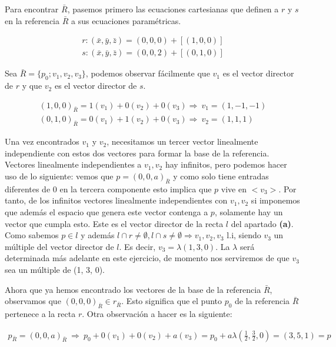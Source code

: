  Para encontrar $\bar{R}$, pasemos primero las ecuaciones cartesianas que definen a  $r$ y $s$ en la referencia $\bar{R}$ a sus ecuaciones paramétricas.
 
 \begin{gather*}
     r : (\bar{x},\bar{y}, \bar{z}) = (0, 0, 0) + [(1, 0, 0)] \\
     s : (\bar{x}, \bar{y}, \bar{z}) = (0, 0, 2) + [(0, 1, 0)]
 \end{gather*}
 
 Sea $\bar{R} = \{p_0; v_1, v_2, v_3\}$, podemos observar fácilmente que $v_1$ es el vector director de $r$ y que $v_2$ es el vector director de $s$.
 
 \begin{gather*}
     (1, 0, 0)_{\bar{R}} = 1(v_1) + 0(v_2) + 0(v_3) \Longrightarrow \ v_1 = (1, -1, -1) \\
     (0, 1, 0)_{\bar{R}} = 0(v_1) + 1(v_2) + 0(v_3) \Longrightarrow \ v_2 = (1, 1, 1)
 \end{gather*}
 
Una vez encontrados $v_1$ y $v_2$, necesitamos un tercer vector linealmente independiente con estos dos vectores para formar la base de la referencia. Vectores linealmente independientes a $v_1, v_2$ hay infinitos, pero podemos hacer uso de lo siguiente: vemos que $p=(0, 0, a)_{\bar{R}}$ y como solo tiene entradas diferentes de 0 en la tercera componente esto implica que $p$ vive en $<v_3>$. Por tanto, de los infinitos vectores linealmente independientes con $v_1, v_2$ si imponemos que además el espacio que genera este vector contenga a $p$, solamente hay un vector que cumpla esto. Este es el vector director de la recta $l$ del apartado \textbf{(a)}. Como sabemos $p \in l$ y además $l \cap r \neq \emptyset, l \cap s \neq \emptyset \Longrightarrow v_1, v_2, v_3$ l.i, siendo $v_3$ un múltiple del vector director de $l$. Es decir, $v_3 = \lambda(1,3,0)$. La $\lambda$ será determinada más adelante en este ejercicio, de momento nos serviremos de que $v_3$ sea un múltiple de (1, 3, 0).

Ahora que ya hemos encontrado los vectores de la base de la referencia $\bar{R}$, observamos que $(0, 0, 0)_{\bar{R}} \in r_{\bar{R}}$. Esto significa que el punto $p_0$ de la referencia $\bar{R}$ pertenece a la recta $r$. Otra observación a hacer es la siguiente:
 
 \begin{gather*}
     p_{\bar{R}} = (0, 0, a)_{\bar{R}} \ \Longrightarrow \ p_0 + 0(v_1) + 0(v_2) + a(v_3) = p_0 + a\lambda(\frac{1}{2}, \frac{3}{2}, 0) = (3, 5, 1) = p
 \end{gather*}
 
